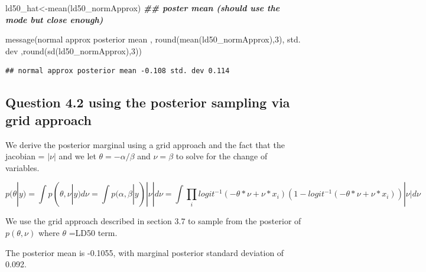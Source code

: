 \documentclass[
]{book}
\newenvironment{Shaded}{\begin{snugshade}}{\end{snugshade}}
\newcommand{\DecValTok}[1]{\textcolor[rgb]{0.00,0.00,0.81}{#1}}
\newcommand{\DocumentationTok}[1]{\textcolor[rgb]{0.56,0.35,0.01}{\textbf{\textit{#1}}}}
\newcommand{\FunctionTok}[1]{\textcolor[rgb]{0.00,0.00,0.00}{#1}}
\newcommand{\NormalTok}[1]{#1}
\newcommand{\OtherTok}[1]{\textcolor[rgb]{0.56,0.35,0.01}{#1}}
\newcommand{\StringTok}[1]{\textcolor[rgb]{0.31,0.60,0.02}{#1}}
\theoremstyle{definition}
\theoremstyle{definition}
\theoremstyle{definition}
\theoremstyle{definition}
\theoremstyle{remark}
\begin{document}
\begin{Shaded}
\begin{Highlighting}[]
\NormalTok{ ld50\_hat}\OtherTok{\textless{}{-}}\FunctionTok{mean}\NormalTok{(ld50\_normApprox)  }\DocumentationTok{\#\# poster mean (should use the mode but close enough)}
 
 \FunctionTok{message}\NormalTok{(}\StringTok{\textquotesingle{}normal approx posterior mean \textquotesingle{}}\NormalTok{, }\FunctionTok{round}\NormalTok{(}\FunctionTok{mean}\NormalTok{(ld50\_normApprox),}\DecValTok{3}\NormalTok{),}\StringTok{\textquotesingle{} std. dev \textquotesingle{}}\NormalTok{,}\FunctionTok{round}\NormalTok{(}\FunctionTok{sd}\NormalTok{(ld50\_normApprox),}\DecValTok{3}\NormalTok{))}
\end{Highlighting}
\end{Shaded}

\begin{verbatim}
## normal approx posterior mean -0.108 std. dev 0.114
\end{verbatim}

\hypertarget{question-4.2-using-the-posterior-sampling-via-grid-approach}{%
\subsection{Question 4.2 using the posterior sampling via grid approach}\label{question-4.2-using-the-posterior-sampling-via-grid-approach}}

We derive the posterior marginal using a grid approach and the fact that the jacobian = \(|\nu|\) and we let \(\theta= -\alpha/\beta\) and \(\nu=\beta\) to solve for the change of variables.

\[
p(\theta|y) = \int p(\theta,\nu|y)d\nu = \int p(\alpha,\beta|y)|\nu|d\nu 
=\int \prod_i logit^{-1}(-\theta*\nu+\nu*x_i)(1-logit^{-1}(-\theta*\nu+\nu*x_i))|\nu|d\nu
\]

We use the grid approach described in section 3.7 to sample from the posterior of \(p(\theta,\nu)\) where \(\theta\) =LD50 term.

The posterior mean is -0.1055, with marginal posterior standard deviation of 0.092.
\end{document}
